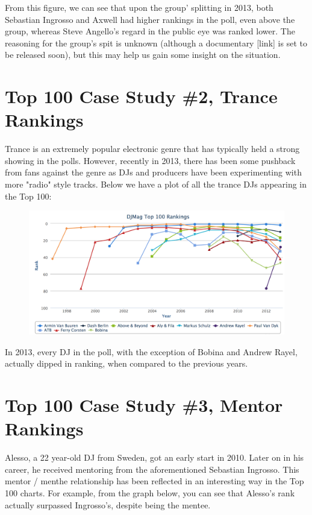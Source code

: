 \documentclass[12pt]{dalcsthesis}
\begin{document}
From this figure, we can see that upon the group' splitting in 2013, both Sebastian Ingrosso and Axwell had higher rankings in the poll, even above the group, whereas Steve Angello's regard in the public eye was ranked lower. The reasoning for the group's spit is unknown (although a documentary [link] is set to be released soon), but this may help us gain some insight on the situation.

\section{Top 100 Case Study \#2, Trance Rankings}

Trance is an extremely popular electronic genre that has typically held a strong showing in the polls. However, recently in 2013, there has been some pushback from fans against the genre as DJs and producers have been experimenting with more "radio" style tracks. Below we have a plot of all the trance DJs appearing in the Top 100:

\begin{figure}[h]
\includegraphics[scale=.4]{trance_graph}
\centering
\end{figure}

In 2013, every DJ in the poll, with the exception of Bobina and Andrew Rayel, actually dipped in ranking, when compared to the previous years.

\section{Top 100 Case Study \#3, Mentor Rankings}

Alesso, a 22 year-old DJ from Sweden, got an early start in 2010. Later on in his career, he received mentoring from the aforementioned Sebastian Ingrosso. This mentor / menthe relationship has been reflected in an interesting way in the Top 100 charts. For example, from the graph below, you can see that Alesso's rank actually surpassed Ingrosso's, despite being the mentee.
\end{document}
